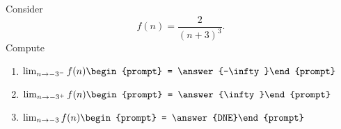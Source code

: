 \documentclass{ximera}
\author{Bart Snapp}
\begin{document}
\begin{exercise}
Consider 
\[
f(n) = \frac{2}{(n+3)^3}.
\]
Compute
\begin{enumerate}
\item $\lim_{n\to -3^- } f(n) \begin{prompt} = \answer{-\infty}\end{prompt}$
\item $\lim_{n\to -3^+ } f(n) \begin{prompt} = \answer{\infty}\end{prompt}$
\item $\lim_{n\to -3 } f(n) \begin{prompt} = \answer{DNE}\end{prompt}$
\end{enumerate}
\end{exercise}
\end{document}
